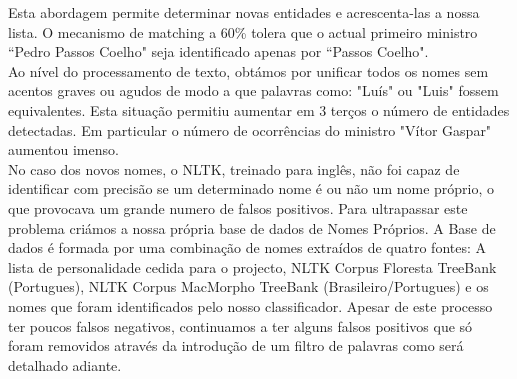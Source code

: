 Esta abordagem permite determinar novas entidades e acrescenta-las a nossa lista. O mecanismo de matching a 60\% tolera que o actual primeiro ministro ``Pedro Passos Coelho" seja identificado apenas por ``Passos Coelho". \\
\hspace{15pt}Ao nível do processamento de texto, obtámos por unificar todos os nomes sem acentos graves ou agudos de modo a que palavras como: "Luís" ou "Luis" fossem equivalentes. Esta situação permitiu aumentar em 3 terços o número de entidades detectadas. Em particular o número de ocorrências do ministro "Vítor Gaspar" aumentou imenso.\\
No caso dos novos nomes, o NLTK, treinado para inglês, não foi capaz de identificar com precisão se um determinado nome é ou não um nome próprio, o que provocava um grande numero de falsos positivos. Para ultrapassar este problema criámos a nossa própria base de dados de Nomes Próprios. A Base de dados é formada por uma combinação de nomes extraídos de quatro fontes: A lista de personalidade cedida para o projecto, NLTK Corpus Floresta TreeBank (Portugues), NLTK Corpus MacMorpho TreeBank (Brasileiro/Portugues) e os nomes que foram identificados pelo nosso classificador. Apesar de este processo ter poucos falsos negativos, continuamos a ter alguns falsos positivos que só foram removidos através da introdução de um filtro de palavras como será detalhado adiante.\\
